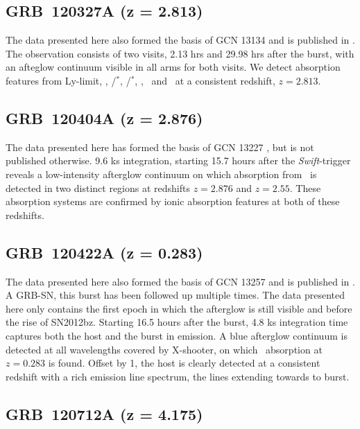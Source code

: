 \documentclass{aa}    %
\begin{document}
\subsection{GRB~120327A (z = 2.813)} \label{120327}

The data presented here also formed the basis of GCN 13134 \citep{GCN13134} and
is published in \citet{DElia2014}. The observation consists of two visits, 2.13
hrs and 29.98 hrs after the burst, with an afteglow continuum visible in all
arms for both visits. We detect absorption features from Ly-limit, \lya,
\cii/\cii$^*$, \SIii/\SIii$^*$, \ali, \feii ~and \mgii~at a consistent redshift,
$z = 2.813$.

\subsection{GRB~120404A (z = 2.876)} \label{120404}

The data presented here has formed the basis of GCN 13227 \citep{GCN13227}, but
is not published otherwise. 9.6 ks integration, starting 15.7 hours after the
\textit{Swift}-trigger reveals a low-intensity afterglow continuum on which
absorption from \lya~is detected in two distinct regions at redshifts $z=2.876$
and $z=2.55$. These absorption systems are confirmed by ionic absorption
features at both of these redshifts.


\subsection{GRB~120422A (z = 0.283)} \label{120422}

The data presented here also formed the basis of GCN 13257 \citep{GCN13257} and
is published in \citet{Schulze2014}. A GRB-SN, this burst has been followed up
multiple times. The data presented here only contains the first epoch in which
the afterglow is still visible and before the rise of SN2012bz. Starting 16.5
hours after the burst, 4.8 ks integration time captures both the host and the
burst in emission. A blue afterglow continuum is detected at all wavelengths
covered by X-shooter, on which \mgii~absorption at $z = 0.283$ is found. Offset
by 1, the host is clearly detected at a consistent redshift with a rich
emission line spectrum, the lines extending towards to burst.

\subsection{GRB~120712A (z = 4.175)} \label{120712}
\end{document}
